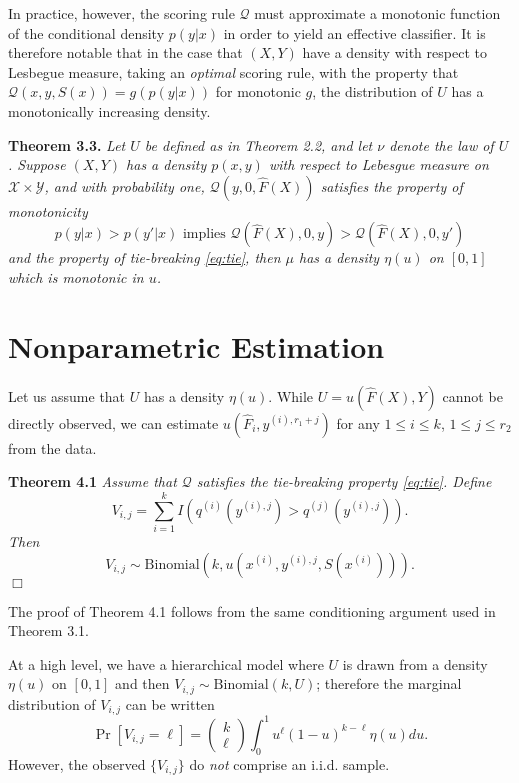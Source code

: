 \documentclass{article}
\begin{document}
In practice, however, the scoring rule $\mathcal{Q}$ must approximate a monotonic function of the conditional density $p(y|x)$
in order to yield an effective classifier.  It is therefore notable that in the case that $(X, Y)$ have a density with respect to Lesbegue measure,
taking an \emph{optimal} scoring rule,
with the property that $\mathcal{Q}(x, y, S(x)) = g(p(y|x))$ for monotonic $g$,
the distribution of $U$ has a monotonically increasing density.

\noindent\textbf{Theorem 3.3.} \emph{ Let $U$ be defined as in Theorem
  2.2, and let $\nu$ denote the law of $U$.  Suppose $(X, Y)$ has a density $p(x, y)$ with respect to 
  Lebesgue measure on $\mathcal{X} \times \mathcal{Y}$,
  and with probability one, $\mathcal{Q}(y, 0, \hat{F}(X))$ satisfies the property of monotonicity
  \[
  p(y|x) > p(y'|x) \text{ implies } \mathcal{Q}(\hat{F}(X), 0, y) > \mathcal{Q}(\hat{F}(X), 0, y')
  \]
  and the property of tie-breaking \eqref{eq:tie},
  then $\mu$ has a density $\eta(u)$ on $[0, 1]$ which is monotonic in $u$.
}

\section{Nonparametric Estimation}

Let us assume that $U$ has a density $\eta(u)$.
While $U = u(\hat{F}(X), Y)$ cannot be directly observed, we can estimate $u(\hat{F}_i, y^{(i), r_1 + j})$ for any $1 \leq i \leq k$,
$1 \leq j \leq r_2$ from the data.

\noindent\textbf{Theorem 4.1}\emph{
Assume that $\mathcal{Q}$ satisfies the tie-breaking property \eqref{eq:tie}.
Define
\[
V_{i, j} = \sum_{i=1}^k I(q^{(i)}(y^{(i), j}) > q^{(j)}(y^{(i), j})).
\]
Then
\[
V_{i, j} \sim \text{Binomial}(k, u(x^{(i)}, y^{(i), j}, S(x^{(i)}))).
\]}
$\Box$

The proof of Theorem 4.1 follows from the same conditioning argument used in Theorem 3.1.

At a high level, we have a hierarchical model where $U$ is drawn from a density $\eta(u)$ on $[0, 1]$
and then $V_{i, j} \sim \text{Binomial}(k, U)$;
therefore the marginal distribution of $V_{i, j}$ can be written
\[
\Pr[V_{i,j} = \ell] = \begin{pmatrix}
k \\ \ell
\end{pmatrix}
\int_0^1 u^\ell (1-u)^{k-\ell} \eta(u) du.
\]
However, the observed $\{V_{i, j}\}$ do \emph{not} comprise an i.i.d. sample.
\end{document}
